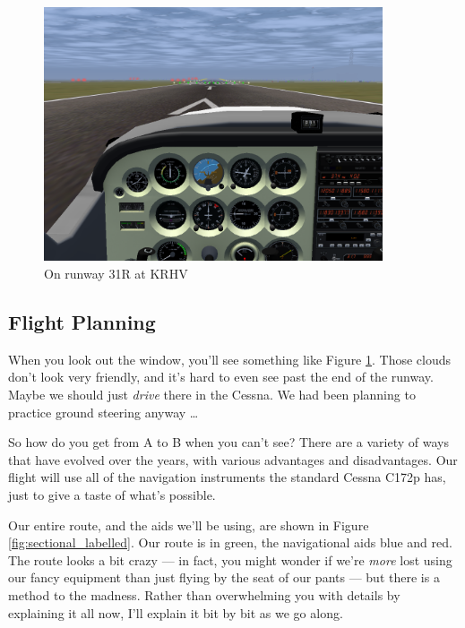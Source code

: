 

\begin{figure}
  \begin{center}
    \includegraphics[width=10cm]{img/KRHV}
    \caption{On runway 31R at KRHV}
    \label{fig:KRHV}
  \end{center}
\end{figure}

\subsection{Flight Planning}

When you look out the window, you'll see something like Figure
\ref{fig:KRHV}.  Those clouds don't look very friendly, and it's hard
to even see past the end of the runway.  Maybe we should just
\emph{drive} there in the Cessna.  We had been planning to practice
ground steering anyway \ldots{}

So how do you get from A to B when you can't see?  There are a variety
of ways that have evolved over the years, with various advantages and
disadvantages.  Our flight will use all of the navigation instruments
the standard Cessna C172p has, just to give a taste of what's
possible.

Our entire route, and the aids we'll be using, are shown in
Figure \ref{fig:sectional_labelled}.  Our route is in green, the
navigational aids blue and red.  The route looks a bit crazy --- in
fact, you might wonder if we're \emph{more} lost using our fancy
equipment than just flying by the seat of our pants --- but there is a
method to the madness.  Rather than overwhelming you with details by
explaining it all now, I'll explain it bit by bit as we go along.

